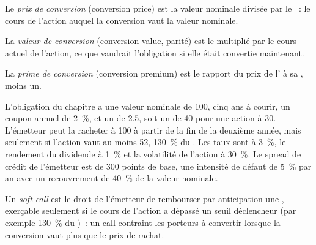 \begin{definition}\label{def:dv:convertibles-and-the-credit-equity-link:price}
Le \emph{prix de conversion} (conversion price) est la valeur nominale divisée par le ~: le cours de l'action auquel
la conversion vaut la valeur nominale.
\end{definition}

\begin{definition}\label{def:dv:convertibles-and-the-credit-equity-link:value}
La \emph{valeur de conversion} (conversion value, parité) est le  multiplié par le cours actuel de l'action, ce que vaudrait l'obligation
si elle était convertie maintenant.
\end{definition}

\begin{definition}\label{def:dv:convertibles-and-the-credit-equity-link:premium}
La \emph{prime de conversion} (conversion premium) est le rapport du prix de l' à sa , moins un.
\end{definition}

L'obligation du chapitre a une valeur nominale de 100, cinq ans à courir, un coupon annuel de 2~\%, et un  de 2.5, soit un  de 40 pour une action à 30. L'émetteur peut la racheter à 100 à partir de la fin de la deuxième année, mais seulement si l'action vaut au moins 52,
130~\% du . Les taux sont à 3~\%, le rendement du dividende à 1~\% et la volatilité de l'action à 30~\%. Le spread de crédit de l'émetteur est de 300
points de base, une intensité de défaut de 5~\% par an avec un recouvrement de 40~\% de la valeur nominale.

\begin{definition}\label{def:dv:convertibles-and-the-credit-equity-link:softcall}
Un \emph{soft call} est le droit de l'émetteur de rembourser par anticipation une , exerçable seulement si le cours de l'action
a dépassé un seuil déclencheur (par exemple 130~\% du )~: un call contraint les porteurs
à convertir lorsque la conversion vaut plus que le prix de rachat.
\end{definition}

